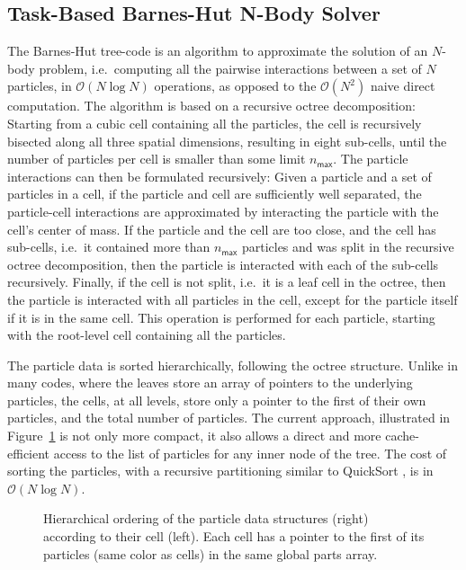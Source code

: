 \documentclass[preprint]{elsarticle}
\newcommand{\oh}[1]
    {\mbox{$ {\mathcal O}( #1 ) $}}
\newcommand{\fig}[1]
    {Figure~\ref{fig:#1}}
\begin{document}
\subsection{Task-Based Barnes-Hut N-Body Solver}

The Barnes-Hut tree-code is an algorithm to approximate the
solution of an $N$-body problem, i.e.~computing all the
pairwise interactions between a set of $N$ particles,
in \oh{N\log N} operations, as opposed to the \oh{N^2}
naive direct computation.
The algorithm is based on a recursive octree decomposition:
Starting from a cubic cell containing all the particles,
the cell is recursively bisected along all three spatial dimensions,
resulting in eight sub-cells, until the number of particles
per cell is smaller than some limit $n_\mathsf{max}$.
The particle interactions can then be formulated recursively:
Given a particle and a set of particles in a cell,
if the particle and cell
are sufficiently well separated, the particle-cell interactions
are approximated by interacting the particle with the cell's
center of mass.
If the particle and the cell are too close, and the cell
has sub-cells, i.e.~it contained more than $n_\mathsf{max}$
particles and was split in the recursive octree decomposition,
then the particle is interacted with each of the sub-cells
recursively.
Finally, if the cell is not split, i.e.~it is a leaf cell
in the octree, then the particle is interacted with all
particles in the cell, except for the particle itself if
it is in the same cell.
This operation is performed for each particle, starting
with the root-level cell containing all the particles.

The particle data is sorted hierarchically, following the
octree structure.
Unlike in many codes, where the leaves store an array of
pointers to the underlying particles, the cells, at all
levels, store only a pointer to the first of their own particles,
and the total number of particles.
The current approach, illustrated in \fig{CellParts} is not
only more compact, it also allows a direct and more cache-efficient access
to the list of particles for any inner node of the tree.
The cost of sorting the particles, with a recursive
partitioning similar to QuickSort \cite{ref:Hoare1962},
is in \oh{N\log N}.

\begin{figure}
    \centerline{}
    \caption{Hierarchical ordering of the particle data structures
    (right) according to their cell (left).
    Each cell has a pointer to the first of its particles (same color
    as cells) in the same global parts array.}
    \label{fig:CellParts}
\end{figure}
\end{document}
